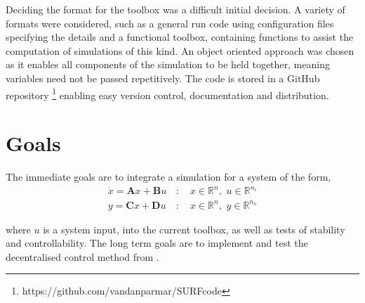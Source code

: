 \documentclass[11pt,a4paper]{article}
\begin{document}
Deciding the format for the toolbox was a difficult initial decision. A variety of formats were considered, such as a general run code using configuration files specifying the details and a functional toolbox, containing functions to assist the computation of simulations of this kind. An object oriented approach was chosen as it enables all components of the simulation to be held together, meaning variables need not be passed repetitively. The code is stored in a GitHub repository \footnote{https://github.com/vandanparmar/SURFcode} enabling easy version control, documentation and distribution.

\section*{Goals}
The immediate goals are to integrate a simulation for a system of the form,
\begin{equation*}
\begin{split}
 \dot{x} = \textbf{A}x + \textbf{B}u \,&: \quad x \in \mathbb{R}^{n},\,\, u \in \mathbb{R}^{n_i} \\
 y = \textbf{C}x+\textbf{D}u \, &: \quad x \in \mathbb{R}^{n}, \,\, y \in \mathbb{R}^{n_o}
\end{split}
\end{equation*}
 

where $u$ is a system input, into the current toolbox, as well as tests of stability and controllability. The long term goals are to implement and test the decentralised control method from \cite{Wang2017}.



\end{document}
